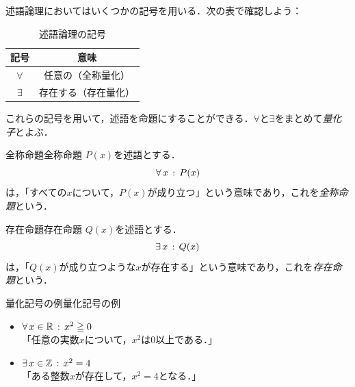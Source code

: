 述語論理においてはいくつかの記号を用いる．次の表で確認しよう：

\begin{table}[ht]
  \centering
  \caption{述語論理の記号}
  \begin{tabular}{c|c}
    \hline
    記号        & 意味                              \\
    \hline
    $\forall$ & 任意の（全称量化\index{ぜんしょうりょうか@全称量化}） \\
    $\exists$ & 存在する（存在量化\index{そんざいりょうか@存在量化}） \\
    \hline
  \end{tabular}
\end{table}

これらの記号を用いて，述語を命題にすることができる．$\forall$と$\exists$をまとめて\emph{量化子}とよぶ．

\begin{definition}{全称命題}{全称命題}
  $P(x)$を述語とする．
  \[
    \forall\, x \,:\, P(x)
  \]
  は，「すべての$x$について，$P(x)$が成り立つ」という意味であり，これを\emph{全称命題}という．
\end{definition}

\begin{definition}{存在命題}{存在命題}
  $Q(x)$を述語とする．
  \[
    \exists\, x \,:\, Q(x)
  \]
  は，「$Q(x)$が成り立つような$x$が存在する」という意味であり，これを\emph{存在命題}という．
\end{definition}

\begin{example}{量化記号の例}{量化記号の例}
  \begin{itemize}
    \item $\forall\, x \in \mathbb{R} \,:\, x^2 \geqq 0$\\
          「任意の実数$x$について，$x^2$は$0$以上である．」
    \item $\exists\, x \in \mathbb{Z} \,:\, x^2 = 4$\\
          「ある整数$x$が存在して，$x^2 = 4$となる．」
  \end{itemize}
\end{example}

